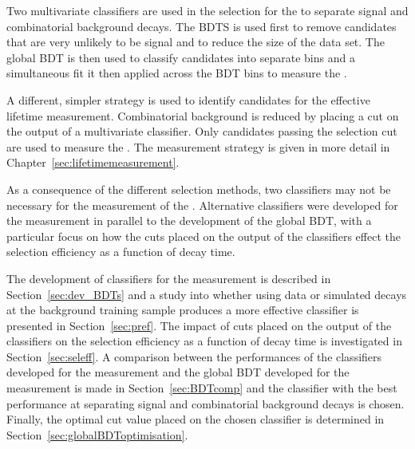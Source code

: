 Two multivariate classifiers are used in the selection for the \BFm to separate signal and combinatorial background decays. The BDTS is used first to remove candidates that are very unlikely to be signal and to reduce the size of the data set. The global BDT is then used to classify candidates into separate bins and a simultaneous fit it then applied across the BDT bins to measure the \BFs.

A different, simpler strategy is used to identify candidates for the \bsmumu effective lifetime measurement. Combinatorial background is reduced by placing a cut on the output of a multivariate classifier. Only candidates passing the selection cut are used to measure the \el. The measurement strategy is given in more detail in Chapter~\ref{sec:lifetimemeasurement}. 

As a consequence of the different selection methods, two classifiers may not be necessary for the measurement of the \el. Alternative classifiers were developed for the \el measurement in parallel to the development of the global BDT, with a particular focus on how the cuts placed on the output of the classifiers effect the selection efficiency as a function of decay time.


The development of classifiers for the \el measurement is described in Section~\ref{sec:dev_BDTs} and a study into whether using data or simulated decays at the background training sample produces a more effective classifier is presented in Section~\ref{sec:pref}. 
The impact of cuts placed on the output of the classifiers on the selection efficiency as a function of decay time is investigated in Section~\ref{sec:seleff}. A comparison between the performances of the classifiers developed for the \el measurement and the global BDT developed for the \BF measurement is made in Section~\ref{sec:BDTcomp} and the classifier with the best performance at separating signal and combinatorial background decays is chosen.
Finally, the optimal cut value placed on the chosen classifier is determined in Section~\ref{sec:globalBDToptimisation}.



